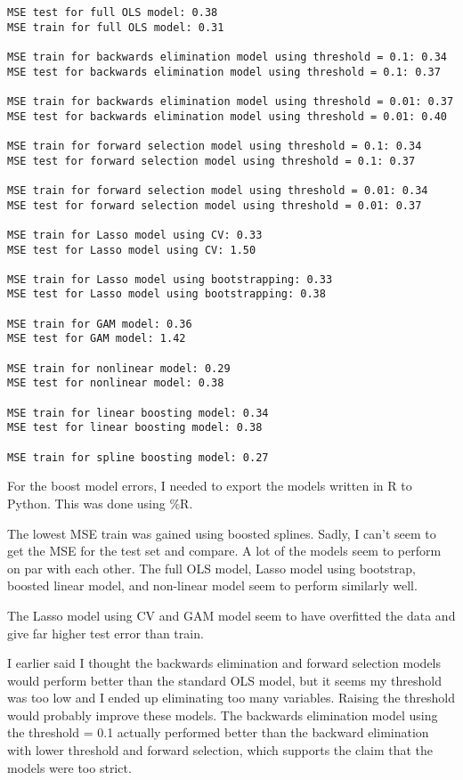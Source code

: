 \documentclass[11pt]{article}
\begin{document}
    \begin{Verbatim}[commandchars=\\\{\}]
MSE test for full OLS model: 0.38
MSE train for full OLS model: 0.31

MSE train for backwards elimination model using threshold = 0.1: 0.34
MSE test for backwards elimination model using threshold = 0.1: 0.37

MSE train for backwards elimination model using threshold = 0.01: 0.37
MSE test for backwards elimination model using threshold = 0.01: 0.40

MSE train for forward selection model using threshold = 0.1: 0.34
MSE test for forward selection model using threshold = 0.1: 0.37

MSE train for forward selection model using threshold = 0.01: 0.34
MSE test for forward selection model using threshold = 0.01: 0.37

MSE train for Lasso model using CV: 0.33
MSE test for Lasso model using CV: 1.50

MSE train for Lasso model using bootstrapping: 0.33
MSE test for Lasso model using bootstrapping: 0.38

MSE train for GAM model: 0.36
MSE test for GAM model: 1.42

MSE train for nonlinear model: 0.29
MSE test for nonlinear model: 0.38

MSE train for linear boosting model: 0.34
MSE test for linear boosting model: 0.38

MSE train for spline boosting model: 0.27
    \end{Verbatim}

    For the boost model errors, I needed to export the models written in R
to Python. This was done using \%R.

The lowest MSE train was gained using boosted splines. Sadly, I can't
seem to get the MSE for the test set and compare. A lot of the models
seem to perform on par with each other. The full OLS model, Lasso model
using bootstrap, boosted linear model, and non-linear model seem to
perform similarly well.

The Lasso model using CV and GAM model seem to have overfitted the data
and give far higher test error than train.

I earlier said I thought the backwards elimination and forward selection
models would perform better than the standard OLS model, but it seems my
threshold was too low and I ended up eliminating too many variables.
Raising the threshold would probably improve these models. The backwards
elimination model using the threshold = 0.1 actually performed better
than the backward elimination with lower threshold and forward
selection, which supports the claim that the models were too strict.
\end{document}
